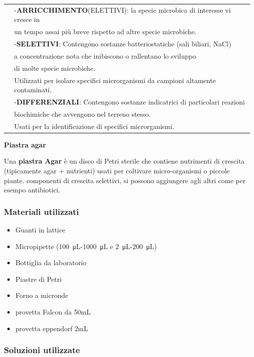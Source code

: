 \begin{tabular}{ll}
& -\textbf{ARRICCHIMENTO}(ELETTIVI): la specie microbica di interesse vi cresce in \\ \cline{1-1}
& un tempo assai più breve rispetto ad altre specie microbiche.\\
& -\textbf{SELETTIVI}: Contengono sostanze batteriostatiche (sali biliari, NaCl) \\
&  a concentrazione nota che inibiscono o rallentano lo sviluppo \\
& di molte specie microbiche. \\
&  Utilizzati per isolare specifici microrganismi da campioni altamente contaminati.\\
& -\textbf{DIFFERENZIALI}: Contengono sostanze indicatrici di particolari reazioni \\
& biochimiche che avvengono nel terreno stesso. \\
& Usati per la identificazione di specifici microrganismi.\\


\end{tabular}

\textbf{Piastra agar}
\vspace{0.3cm}

Una \textbf{piastra Agar} è un disco di Petri sterile che contiene nutrimenti
di crescita (tipicamente agar + nutrienti) usati per coltivare micro-organismi o piccole piante.
componenti di crescita selettivi, si possono aggiungere agli altri come per esempo antibiotici.




\subsubsection{Materiali utilizzati}

\begin{itemize}
	\item Guanti in lattice
	\item Micropipette (\SI{100}{\micro\liter}-\SI{1000}{\micro\liter} e \SI{2}{\micro\liter}-\SI{200}{\micro\liter})
	\item Bottiglia da laboratorio
  \item Piastre di Petri
	\item Forno a micronde
  \item provetta Falcon da 50mL
  \item provetta eppendorf 2mL

\end{itemize}

\subsubsection{Soluzioni utilizzate}

